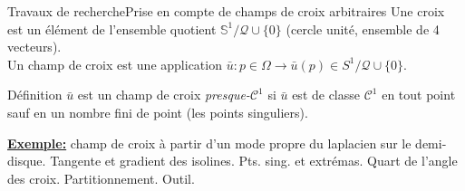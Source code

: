 \documentclass[compress,10pt,aspectratio=169]{beamer}
\begin{document}
\begin{frame}{Travaux de recherche}{Prise en compte de champs de croix arbitraires}
\small
Une {\color{onera}croix} est un élément de l'ensemble quotient $\mathbb{S}^1/\mathcal{Q}\cup\{0\}$ {\color{onera_gray}(cercle unité, ensemble de 4 vecteurs)}.\\\vspace{0.2cm}
Un {\color{onera}champ de croix} est une application $\bar{u}:p\in\Omega\rightarrow \bar{u}(p)\in S^1/\mathcal{Q}\cup\{0\}$.\\\vspace{0.2cm}

\begin{onerablock}{\small Définition}
\small
$\bar{u}$ est un champ de croix \emph{presque-$\mathcal{C}^1$} si $\bar{u}$ est de classe $\mathcal{C}^1$ en tout point sauf en un nombre fini de point {\color{onera_gray}(les points singuliers)}.
\end{onerablock}

{\bf\underline{Exemple:}} {\color{onera_gray} champ de croix à partir d'un mode propre du laplacien sur le demi-disque. Tangente et gradient des isolines. Pts. sing. et extrémas. Quart de l'angle des croix. Partitionnement. Outil.}




\end{frame}
\end{document}
